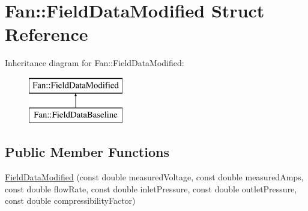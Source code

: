 \hypertarget{struct_fan_1_1_field_data_modified}{}\section{Fan\+:\+:Field\+Data\+Modified Struct Reference}
\label{struct_fan_1_1_field_data_modified}
Inheritance diagram for Fan\+:\+:Field\+Data\+Modified\+:\begin{figure}[H]
\begin{center}
\leavevmode
\includegraphics[height=2.000000cm]{d0/db0/struct_fan_1_1_field_data_modified}
\end{center}
\end{figure}
\subsection*{Public Member Functions}
\begin{DoxyCompactItemize}
\item 
\hyperlink{struct_fan_1_1_field_data_modified_adef6a41f34fefd1acf3253d30fb4048d}{Field\+Data\+Modified} (const double measured\+Voltage, const double measured\+Amps, const double flow\+Rate, const double inlet\+Pressure, const double outlet\+Pressure, const double compressibility\+Factor)
\end{DoxyCompactItemize}
